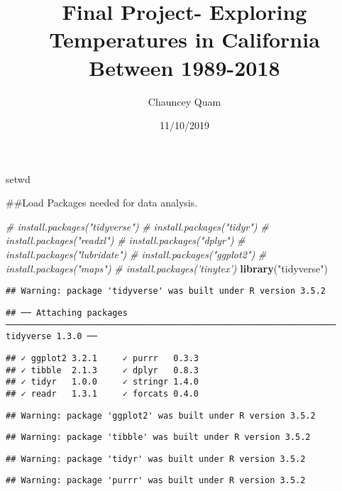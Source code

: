 \documentclass[]{article}
\title{Final Project- Exploring Temperatures in California Between 1989-2018}
\author{Chauncey Quam}
\date{11/10/2019}
\newenvironment{Shaded}{\begin{snugshade}}{\end{snugshade}}
\newcommand{\CommentTok}[1]{\textcolor[rgb]{0.56,0.35,0.01}{\textit{#1}}}
\newcommand{\KeywordTok}[1]{\textcolor[rgb]{0.13,0.29,0.53}{\textbf{#1}}}
\newcommand{\NormalTok}[1]{#1}
\newcommand{\StringTok}[1]{\textcolor[rgb]{0.31,0.60,0.02}{#1}}
\begin{document}
\maketitle

setwd

\#\#Load Packages needed for data analysis.

\begin{Shaded}
\begin{Highlighting}[]
\CommentTok{# install.packages("tidyverse")}
\CommentTok{# install.packages("tidyr")}
\CommentTok{# install.packages("readxl")}
\CommentTok{# install.packages("dplyr")}
\CommentTok{# install.packages("lubridate")}
\CommentTok{# install.packages("ggplot2")}
\CommentTok{# install.packages("maps")}
\CommentTok{# install.packages('tinytex')}
\KeywordTok{library}\NormalTok{(}\StringTok{"tidyverse"}\NormalTok{)}
\end{Highlighting}
\end{Shaded}

\begin{verbatim}
## Warning: package 'tidyverse' was built under R version 3.5.2
\end{verbatim}

\begin{verbatim}
## ── Attaching packages ───────────────────────────────────────────────────────────────── tidyverse 1.3.0 ──
\end{verbatim}

\begin{verbatim}
## ✓ ggplot2 3.2.1     ✓ purrr   0.3.3
## ✓ tibble  2.1.3     ✓ dplyr   0.8.3
## ✓ tidyr   1.0.0     ✓ stringr 1.4.0
## ✓ readr   1.3.1     ✓ forcats 0.4.0
\end{verbatim}

\begin{verbatim}
## Warning: package 'ggplot2' was built under R version 3.5.2
\end{verbatim}

\begin{verbatim}
## Warning: package 'tibble' was built under R version 3.5.2
\end{verbatim}

\begin{verbatim}
## Warning: package 'tidyr' was built under R version 3.5.2
\end{verbatim}

\begin{verbatim}
## Warning: package 'purrr' was built under R version 3.5.2
\end{verbatim}
\end{document}
